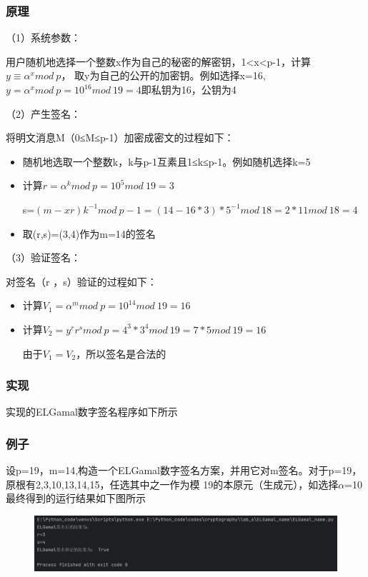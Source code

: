 \documentclass[a4paper,11pt,UTF8]{ctexart}
\newcommand{\bottomcaption}{%
\setlength{\abovecaptionskip}{6pt}%
\setlength{\belowcaptionskip}{6pt}%
\caption}
\newcommand{\xiaowuhao}{\fontsize{9pt}{\baselineskip}\selectfont}   %
\begin{document}
        \subsubsection{原理}
          （1）系统参数：\par
            用户随机地选择一个整数x作为自己的秘密的解密钥，1<x<p-1，计算$y \equiv \alpha ^{x} mod\ p$，
            取y为自己的公开的加密钥。例如选择x=16,$y=\alpha ^{x}mod\ p=10^{16}mod\ 19=4$即私钥为16，公钥为4\par
          （2）产生签名：\par
            将明文消息M（0≤M≤p-1）加密成密文的过程如下：
            \begin{itemize}
              \item 随机地选取一个整数k，k与p-1互素且1≤k≤p-1。例如随机选择k=5
              \item 计算$r=\alpha ^{k}mod\ p=10^{5}mod\ 19=3$\par
                    s=$(m-xr)k^{-1}mod\ p-1=(14-16*3)*5^{-1} mod\ 18=2*11mod\ 18=4$
              \item 取(r,s)=(3,4)作为m=14的签名
            \end{itemize}
          （3）验证签名：\par
            对签名（r ，s）验证的过程如下：
            \begin{itemize}
              \item 计算$V_{1}=\alpha ^{m}mod\ p=10^{14}mod\ 19=16$\par
              \item 计算$V_{2}=y^{r}r^{s}mod\ p=4^{3}*3^{4}mod\ 19=7*5mod\ 19=16$\par
              由于$V_{1}=V_{2}$，所以签名是合法的
            \end{itemize}
            
        \subsubsection{实现}
          实现的ELGamal数字签名程序如下所示
          

        \subsubsection{例子}
          设p=19，m=14,构造一个ELGamal数字签名方案，并用它对m签名。对于p=19，
          原根有{2,3,10,13,14,15}，任选其中之一作为模 19的本原元（生成元），如选择$\alpha $=10
          最终得到的运行结果如下图所示
          \begin{figure}[H]
            \centering
            \includegraphics[width=13cm]{ELGamal_result.png}
            \bottomcaption{\xiaowuhao{ELGamal例子处理结果}}
          \end{figure}
        
\end{document}
